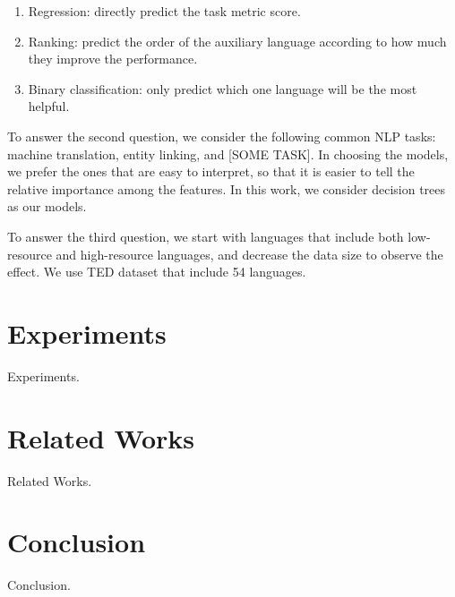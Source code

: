 \documentclass[11pt,a4paper,usenames,dvipsnames]{article}
\begin{document}
\begin{enumerate}

\item Regression: directly predict the task metric score.

\item Ranking: predict the order of the auxiliary language according to how much they improve the performance.

\item Binary classification: only predict which one language will be the most helpful.

\end{enumerate}

To answer the second question, we consider the following common NLP tasks: machine translation, entity linking, and {\color{blue}[SOME TASK]}. In choosing the models, we prefer the ones that are easy to interpret, so that it is easier to tell the relative importance among the features. In this work, we consider decision trees as our models.

To answer the third question, we start with languages that include both low-resource and high-resource languages, and decrease the data size to observe the effect. We use TED dataset that include 54 languages.


\section{Experiments}

{\color{blue}Experiments.}


\section{Related Works}

{\color{blue}Related Works.}


\section{Conclusion}

{\color{blue}Conclusion.}




\end{document}

